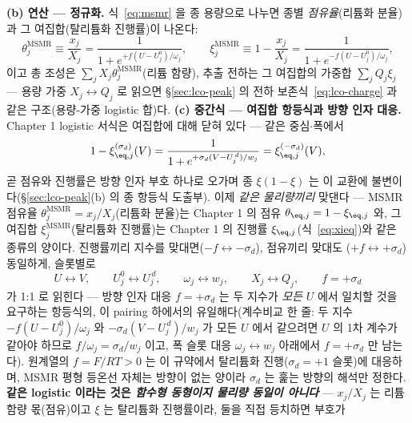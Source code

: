 \textbf{(b) 연산 --- 정규화.} 식~\eqref{eq:msmr} 을 종 용량으로 나누면
종별 \emph{점유율}(리튬화 분율)과 그 여집합(탈리튬화 진행률)이 나온다:
\begin{equation}
\theta_j^{\mathrm{MSMR}}\equiv\frac{x_j}{X_j}=\frac{1}{1+e^{+f(U-U_j^0)/\omega_j}},\qquad
\xi_j^{\mathrm{MSMR}}\equiv1-\frac{x_j}{X_j}=\frac{1}{1+e^{-f(U-U_j^0)/\omega_j}},
\label{eq:lco-msmrnorm}
\end{equation}
이고 총 조성은 $\sum_jX_j\theta_j^{\mathrm{MSMR}}$(리튬 함량), 추출 전하는 그 여집합의 가중합
$\sum_jQ_j\xi_j$ --- 용량 가중 $X_j\!\leftrightarrow\!Q_j$ 로 읽으면 \S\ref{sec:lco-peak} 의 전하
보존식~\eqref{eq:lco-charge} 과 같은 구조(용량-가중 logistic 합)다.
\textbf{(c) 중간식 --- 여집합 항등식과 방향 인자 대응.} Chapter 1 logistic 서식은 여집합에 대해 닫혀 있다 ---
같은 중심$\cdot$폭에서
\begin{equation}
1-\xi_{\eq,j}^{(\sigma_d)}(V)
=\frac{1}{1+e^{+\sigma_d(V-U_j^{\,d})/w_j}}
=\xi_{\eq,j}^{(-\sigma_d)}(V),
\label{eq:lco-comp}
\end{equation}
곧 점유와 진행률은 방향 인자 부호 하나로 오가며 종 $\xi(1-\xi)$ 는 이 교환에 불변이다(\S\ref{sec:lco-peak}(b) 의 종 항등식 도출부). 이제 \emph{같은 물리량끼리} 맞댄다 --- MSMR 점유율
$\theta_j^{\mathrm{MSMR}}=x_j/X_j$(리튬화 분율)는 Chapter 1 의 점유 $\theta_{\eq,j}=1-\xi_{\eq,j}$ 와, 그 여집합
$\xi_j^{\mathrm{MSMR}}$(탈리튬화 진행률)는 Chapter 1 의 진행률 $\xi_{\eq,j}$(식~\eqref{eq:xieq})와 같은 종류의
양이다. 진행률끼리 지수를 맞대면($-f\leftrightarrow-\sigma_d$), 점유끼리 맞대도
($+f\leftrightarrow+\sigma_d$) 동일하게, 슬롯별로
\begin{equation}
U\leftrightarrow V,\qquad U_j^0\leftrightarrow U_j^{\,d},\qquad
\omega_j\leftrightarrow w_j,\qquad X_j\leftrightarrow Q_j,\qquad
f=+\sigma_d
\label{eq:lco-msmrmap}
\end{equation}
가 1:1 로 읽힌다 --- 방향 인자 대응 $f=+\sigma_d$ 는 두 지수가 \emph{모든} $U$ 에서 일치할 것을 요구하는
항등식의, 이 pairing 하에서의 유일해다(계수비교 한 줄: 두 지수 $-f(U-U_j^0)/\omega_j$ 와
$-\sigma_d(V-U_j^{\,d})/w_j$ 가 모든 $U$ 에서 같으려면 $U$ 의 1차 계수가 같아야 하므로
$f/\omega_j=\sigma_d/w_j$ 이고, 폭 슬롯 대응 $\omega_j\leftrightarrow w_j$ 아래에서 $f=+\sigma_d$ 만 남는다). 원계열의 $f=F/RT>0$ 는 이 규약에서 탈리튬화 진행($\sigma_d=+1$ 슬롯)에 대응하며,
MSMR 평형 등온선 자체는 방향이 없는 양이라 $\sigma_d$ 는 훑는 방향의 해석만 정한다. \textbf{같은 logistic 이라는 것은 \emph{함수형 동형이지 물리량 동일이
아니다}} --- $x_j/X_j$ 는 리튬 함량 몫(점유)이고 $\xi$ 는 탈리튬화 진행률이라, 둘을 직접 등치하면 부호가

